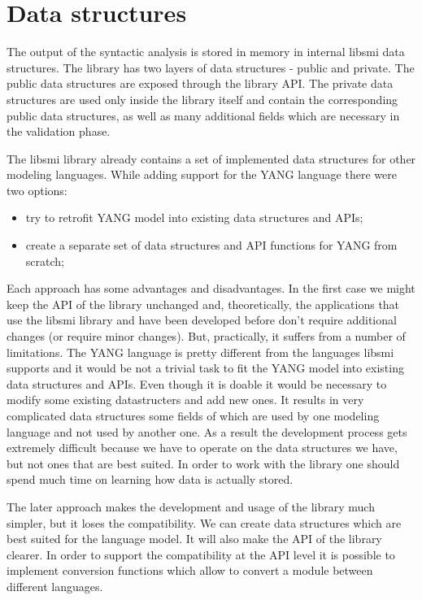 \documentclass[conference]{IEEEtran}
\begin{document}
\section{Data structures}
The output of the syntactic analysis is stored in memory in internal libsmi data structures. The library has two layers of data structures - public and private. The public data structures are exposed through the library API. The private data structures are used only inside the library itself and contain the corresponding public data structures, as well as many additional fields which are necessary in the validation phase. 

The libsmi library already contains a set of implemented data structures for other modeling languages. While adding support for the YANG language there were two options:
\begin{itemize}
\item try to retrofit YANG model into existing data structures and APIs;
\item create a separate set of data structures and API functions for YANG from scratch;
\end{itemize}

Each approach has some advantages and disadvantages. In the first case we might keep the API of the library unchanged and, theoretically, the applications that use the libsmi library and have been developed before don't require additional changes (or require minor changes). But, practically, it suffers from a number of limitations. The YANG language is pretty different from the languages libsmi supports and it would be not a trivial task to fit the YANG model into existing data structures and APIs. Even though it is doable it would be necessary to modify some existing datastructers and add new ones. It results in very complicated data structures some fields of which are used by one modeling language and not used by another one. As a result the development process gets extremely difficult because we have to operate on the data structures we have, but not ones that are best suited. In order to work with the library one should spend much time on learning how  data is actually stored. 

The later approach makes the development and usage of the library much simpler, but it loses the compatibility. We can create data structures which are best suited for the language model. It will also make the API of the library clearer. In order to support the compatibility at the API level it is possible to implement conversion functions which allow to convert a module between different languages. 
\end{document}
